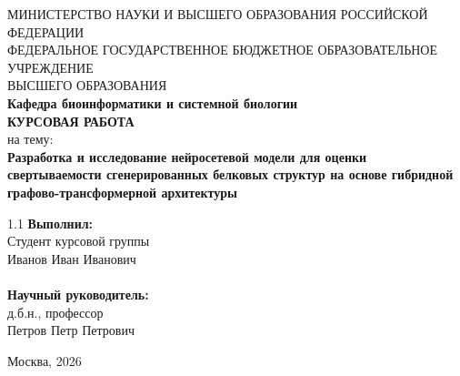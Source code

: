 \documentclass[12pt, a4paper]{article}
\begin{document}
\hypersetup{pageanchor=false}
\begin{titlepage}
\begin{center}
МИНИСТЕРСТВО НАУКИ И ВЫСШЕГО ОБРАЗОВАНИЯ РОССИЙСКОЙ ФЕДЕРАЦИИ\\
\vspace{0.5cm}
ФЕДЕРАЛЬНОЕ ГОСУДАРСТВЕННОЕ БЮДЖЕТНОЕ ОБРАЗОВАТЕЛЬНОЕ УЧРЕЖДЕНИЕ\\
ВЫСШЕГО ОБРАЗОВАНИЯ\\
\vspace{1.5cm}
{\large\bf Кафедра биоинформатики и системной биологии}\\
\vspace{2.5cm}
{\Large\bf КУРСОВАЯ РАБОТА}\\
\vspace{1cm}
{\large на тему:}\\
\vspace{0.5cm}
{\Large\bf Разработка и исследование нейросетевой модели для оценки свертываемости сгенерированных белковых структур на основе гибридной графово-трансформерной архитектуры}\\
\end{center}

\vspace{3.5cm}

\begin{flushright}
\begin{minipage}{0.45\textwidth}
\begin{spacing}{1.1}
{\bf Выполнил:}\\
Студент курсовой группы\\
Иванов Иван Иванович\\
\\
{\bf Научный руководитель:}\\
д.б.н., профессор\\
Петров Петр Петрович
\end{spacing}
\end{minipage}
\end{flushright}

\vspace{\fill}

\begin{center}
Москва, 2026
\end{center}
\end{titlepage}

\newpage
\hypersetup{pageanchor=true}

\end{document}
